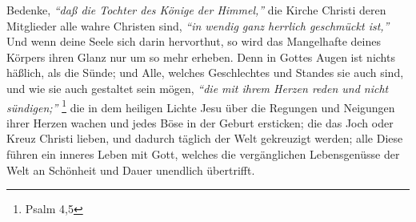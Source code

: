 Bedenke, \textit{"`daß die Tochter des Könige der Himmel,"'} die Kirche Christi
 deren
 Mitglieder alle wahre Christen
sind, \textit{"`in wendig ganz herrlich geschmückt ist,"'}
Und wenn deine Seele sich  darin hervorthut, so wird das Mangelhafte deines
Körpers ihren Glanz nur um so mehr erheben. Denn in Gottes Augen ist nichts
häßlich, als die Sünde; und Alle, welches Geschlechtes und Standes
sie auch
sind, und wie sie auch gestaltet sein mögen,
\textit{"`die mit ihrem Herzen reden und
nicht sündigen;"'}
\footnote{Psalm 4,5}
die in dem heiligen Lichte Jesu über die
Regungen und Neigungen ihrer Herzen wachen und jedes Böse in der Geburt
ersticken; die das Joch oder Kreuz Christi  lieben, und dadurch
täglich der Welt
gekreuzigt werden; alle Diese führen ein inneres Leben mit
Gott, welches die
vergänglichen Lebensgenüsse der Welt an Schönheit und Dauer unendlich
übertrifft.
